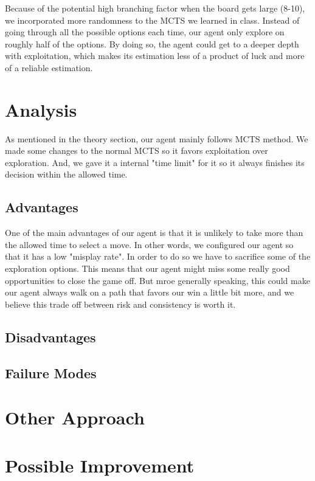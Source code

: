 \documentclass[twoside,11pt]{article}
\begin{document}
Because of the potential high branching factor when the board gets large (8-10), we incorporated more randomness to the MCTS we learned in class. 
Instead of going through all the possible options each time, our agent only explore on roughly half of the options. 
By doing so, the agent could get to a deeper depth with exploitation, which makes its estimation less of a product of luck and more of a reliable estimation.

\section{Analysis}
As mentioned in the theory section, our agent mainly follows MCTS method. 
We made some changes to the normal MCTS so it favors exploitation over exploration. 
And, we gave it a internal "time limit" for it so it always finishes its decision within the allowed time.

\subsection{Advantages}
One of the main advantages of our agent is that it is unlikely to take more than the allowed time to select a move. 
In other words, we configured our agent so that it has a low "misplay rate". 
In order to do so we have to sacrifice some of the exploration options. This means that our agent might miss some really good opportunities to close the game off. 
But mroe generally speaking, this could make our agent always walk on a path that favors our win a little bit more, and we believe this trade off between risk and consistency is worth it.

\subsection{Disadvantages}
\subsection{Failure Modes}

\section{Other Approach}

\section{Possible Improvement}
\end{document}
